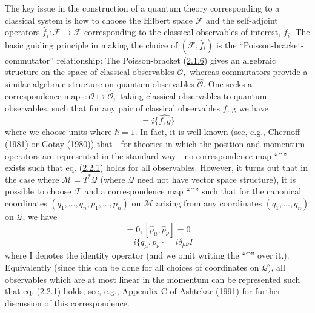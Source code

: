 \documentclass[11pt,a4paper]{article}
\begin{document}
The key issue in the construction of a quantum theory corresponding to a classical system is how to choose the Hilbert space \(\mathcal{F}\) and the self-adjoint operators \(\hat{f}_i \colon \mathcal{F} \to \mathcal{F}\) corresponding to the classical observables of interest, \(f_i\). The basic guiding principle in making the choice of \((\mathcal{F} , \hat{f}_i)\) is the ``Poisson-bracket-commutator'' relationship: The Poisson-bracket (\hyperref[eq:2.1.6]{2.1.6}) gives an algebraic structure on the space of classical observables \(\mathcal{O},\) whereas commutators provide a similar algebraic structure on quantum observables \(\hat{\mathcal{O}}.\) One seeks a correspondence map \(\hat{\ }: \mathcal{O} \mapsto \hat{\mathcal{O}},\) taking classical observables to quantum observables, such that for any pair of classical observables \(f\), g we have
\begin{equation*}
[\hat{f},\hat{g}]=i\widehat{\{f,g\}}\tag{2.2.1}\label{eq:2.2.1}
\end{equation*}
where we choose units where \(\hbar=1\). In fact, it is well known (see, e.g., Chernoff (1981) or Gotay (1980)) that---for theories in which the \hypertarget{source-31}{} position and momentum operators are represented in the standard way---no correspondence map ``\^{}'' exists such that eq. (\hyperref[eq:2.2.1]{2.2.1}) holds for all observables. However, it turns out that in the case where \(\mathcal{M}=T^*\mathcal{Q}\) (where \(\mathcal{Q}\) need not have vector space structure), it is possible to choose \(\mathcal{F}\) and a correspondence map ``\^{}'' such that for the canonical coordinates \((q_1,...,q_n; p_1,...,p_n)\) on \(\mathcal{M}\) arising from any coordinates \((q_1,...,q_n)\) on \(\mathcal{Q}\), we have
\begin{equation*}
[\hat{q}_{\mu}, \hat{q}_{\nu}] = 0, [\hat{p}_{\mu}, \hat{p}_{\nu}] = 0 \tag{2.2.2}\label{eq:2.2.2}
\end{equation*}
\begin{equation*}
[\hat{q}_{\mu}, \hat{p}_{\nu}] = i \{q_{\mu}, p_{\nu}\} = i\delta_{\mu\nu}I \tag{2.2.3}\label{eq:2.2.3}
\end{equation*}
where I denotes the identity operator (and we omit writing the ``\^{}'' over it.). Equivalently (since this can be done for all choices of coordinates on \(\mathcal{Q}\)), all observables which are at most linear in the momentum can be represented such that eq. (\hyperref[eq:2.2.1]{2.2.1}) holds; see, e.g., Appendix C of Ashtekar (1991) for further discussion of this correspondence.
\end{document}

